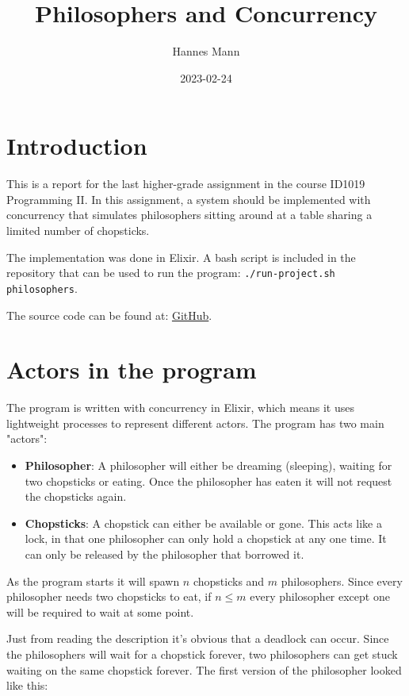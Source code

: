 \documentclass[a4paper,11pt]{article}
\begin{document}
\title{
    \textbf{Philosophers and Concurrency}
}
\author{Hannes Mann}
\date{2023-02-24}

\maketitle

\section*{Introduction}

This is a report for the last higher-grade assignment in the course ID1019 Programming II.
In this assignment, a system should be implemented with concurrency that simulates philosophers sitting around at a table sharing a limited number of chopsticks.

The implementation was done in Elixir. A bash script is included in the repository that can be used to run the program: \texttt{./run-project.sh philosophers}.

The source code can be found at: \href{https://github.com/hannesmann/ID1019/tree/main/src/philosophers}{GitHub}.

\section*{Actors in the program}

The program is written with concurrency in Elixir, which means it uses lightweight processes to represent different actors. The program has two main "actors":

\begin{itemize}
	\item \textbf{Philosopher}: A philosopher will either be dreaming (sleeping), waiting for two chopsticks or eating. Once the philosopher has eaten it will not request the chopsticks again.
	\item \textbf{Chopsticks}: A chopstick can either be available or gone. This acts like a lock, in that one philosopher can only hold a chopstick at any one time. It can only be released by the philosopher that borrowed it.
\end{itemize}

As the program starts it will spawn $n$ chopsticks and $m$ philosophers. Since every philosopher needs two chopsticks to eat, if $n \leq m$ every philosopher except one will be required to wait at some point.

Just from reading the description it's obvious that a deadlock can occur. Since the philosophers will wait for a chopstick forever, two philosophers can get stuck waiting on the same chopstick forever.
The first version of the philosopher looked like this:
\end{document}
